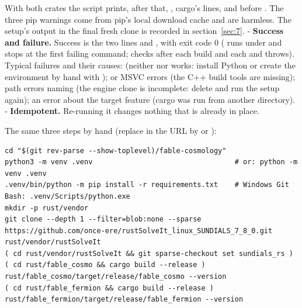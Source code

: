 With both crates the script prints, after that, , cargo's lines, and  before . The three pip warnings come from pip's local download cache and are harmless. The setup's output in the final fresh clone is recorded in section~\ref{sec:7}. - \textbf{Success and failure.} Success is the two  lines and , with exit code 0 ( runs under  and stops at the first failing command;  checks  after each build and each  and throws). Typical failures and their causes:  (neither  nor  works: install Python or create the environment by hand with );  or MSVC errors (the C++ build tools are missing); path errors naming  (the engine clone is incomplete: delete  and run the setup again); an error about the target feature  (cargo was run from another directory). - \textbf{Idempotent.} Re-running it changes nothing that is already in place.

The same three steps by hand (replace  in the URL by  or ):

\begin{Verbatim}
cd "$(git rev-parse --show-toplevel)/fable-cosmology"
python3 -m venv .venv                                  # or: python -m venv .venv
.venv/bin/python -m pip install -r requirements.txt    # Windows Git Bash: .venv/Scripts/python.exe
mkdir -p rust/vendor
git clone --depth 1 --filter=blob:none --sparse https://github.com/once-ere/rustSolveIt_linux_SUNDIALS_7_8_0.git rust/vendor/rustSolveIt
( cd rust/vendor/rustSolveIt && git sparse-checkout set sundials_rs )
( cd rust/fable_cosmo && cargo build --release )
rust/fable_cosmo/target/release/fable_cosmo --version
( cd rust/fable_fermion && cargo build --release )
rust/fable_fermion/target/release/fable_fermion --version
\end{Verbatim}

